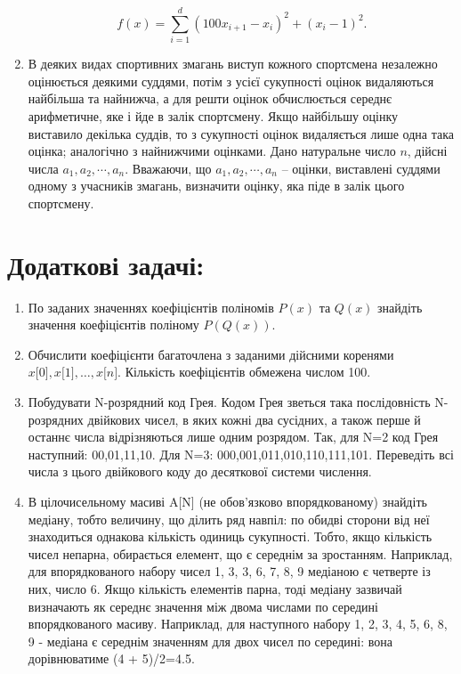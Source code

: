 \documentclass[a5paper,titlepage,openany,twoside,
]
{book_unv}%
\begin{document}
\begin{enumerate}
  $$ f(x) = \sum\limits_{i=1}^{d} (100x_{i+1} - x_{i})^{2} + (x_{i} - 1)^{2}. $$  

\item
  В деяких видах спортивних змагань виступ кожного спортсмена незалежно
  оцінюється деякими суддями, потім з усієї сукупності оцінок
  видаляються найбільша та найнижча, а для решти оцінок
  обчислюється середнє арифметичне, яке і йде в залік спортсмену. Якщо
  найбільшу оцінку виставило декілька суддів, то з сукупності
  оцінок видаляється лише одна така оцінка; аналогічно з
  найнижчими оцінками. Дано натуральне число $n$, дійсні числа
  \(a_{1},a_{2},\cdots,a_{n}\). Вважаючи, що
  \(a_{1},a_{2},\cdots,a_{n}\) -- оцінки, виставлені суддями одному з
  учасників змагань, визначити оцінку, яка піде в залік цього
  спортсмену.
\end{enumerate}

\section{Додаткові задачі:}

\begin{enumerate}
\def\labelenumi{\arabic{enumi})}
\setcounter{enumi}{17}
\item
По заданих значеннях коефіцієнтів поліномів $P(x)$ та $Q(x)$ знайдіть
значення коефіцієнтів поліному $P(Q(x))$.
\item
  Обчислити коефіцієнти багаточлена з заданими дійсними коренями 
$ x{[}0{]},x{[}1{]}, \ldots{}, x{[}n{]}$. Кількість коефіцієнтів обмежена
  числом 100.
\item
  Побудувати N-розрядний код Грея. Кодом Грея зветься така послідовність
  N-розрядних двійкових чисел, в яких кожні два сусідних, а також перше
  й останнє числа відрізняються лише одним розрядом. Так, для N=2 код
  Грея наступний: 00,01,11,10. Для N=3: 000,001,011,010,110,111,101.
  Переведіть всі числа з цього двійкового коду до десяткової системи
  числення.
\item
  В цілочисельному масиві A{[}N{]} (не обов'язково впорядкованому)
  знайдіть медіану, тобто величину, що ділить ряд навпіл: по обидві
  сторони від неї знаходиться однакова кількість одиниць сукупності.
  Тобто, якщо кількість чисел непарна, обирається елемент, що є середнім
  за зростанням. Наприклад, для впорядкованого набору чисел 1, 3, 3, 6,
  7, 8, 9 медіаною є четверте із них, число 6. Якщо кількість елементів
  парна, тоді медіану зазвичай визначають як середнє значення між двома
  числами по середині впорядкованого масиву. Наприклад, для наступного
  набору 1, 2, 3, 4, 5, 6, 8, 9 - медіана є середнім значенням для двох
  чисел по середині: вона дорівнюватиме (4 + 5)/2=4.5.
\end{enumerate}
\end{document}
